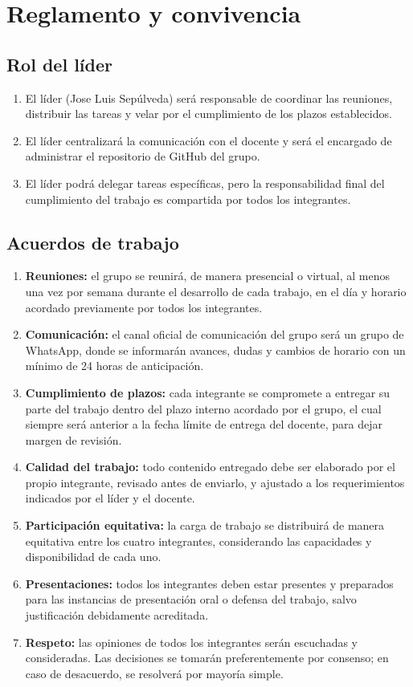 \section{Reglamento y convivencia}

\subsection{Rol del líder}

\begin{enumerate}[label=\alph*)]
    \item El líder (Jose Luis Sepúlveda) será responsable de coordinar las reuniones, distribuir las tareas y velar por el cumplimiento de los plazos establecidos.
    \item El líder centralizará la comunicación con el docente y será el encargado de administrar el repositorio de GitHub del grupo.
    \item El líder podrá delegar tareas específicas, pero la responsabilidad final del cumplimiento del trabajo es compartida por todos los integrantes.
\end{enumerate}

\subsection{Acuerdos de trabajo}

\begin{enumerate}[label=\arabic*.]
    \item \textbf{Reuniones:} el grupo se reunirá, de manera presencial o virtual, al menos una vez por semana durante el desarrollo de cada trabajo, en el día y horario acordado previamente por todos los integrantes.
    \item \textbf{Comunicación:} el canal oficial de comunicación del grupo será un grupo de WhatsApp, donde se informarán avances, dudas y cambios de horario con un mínimo de 24 horas de anticipación.
    \item \textbf{Cumplimiento de plazos:} cada integrante se compromete a entregar su parte del trabajo dentro del plazo interno acordado por el grupo, el cual siempre será anterior a la fecha límite de entrega del docente, para dejar margen de revisión.
    \item \textbf{Calidad del trabajo:} todo contenido entregado debe ser elaborado por el propio integrante, revisado antes de enviarlo, y ajustado a los requerimientos indicados por el líder y el docente.
    \item \textbf{Participación equitativa:} la carga de trabajo se distribuirá de manera equitativa entre los cuatro integrantes, considerando las capacidades y disponibilidad de cada uno.
    \item \textbf{Presentaciones:} todos los integrantes deben estar presentes y preparados para las instancias de presentación oral o defensa del trabajo, salvo justificación debidamente acreditada.
    \item \textbf{Respeto:} las opiniones de todos los integrantes serán escuchadas y consideradas. Las decisiones se tomarán preferentemente por consenso; en caso de desacuerdo, se resolverá por mayoría simple.
\end{enumerate}

